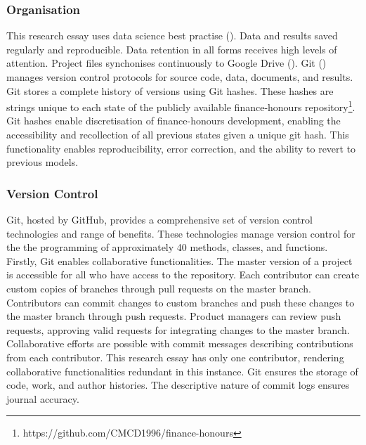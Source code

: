 \documentclass[12pt]{article}
\begin{document}
{\subsubsection{Organisation}
This research essay uses data science best practise (\cite{J:10}).
Data and results saved regularly and reproducible. 
Data retention in all forms receives high levels of attention. 
Project files synchonises continuously to Google Drive (\cite{Google_Drive}). 
Git (\cite{Git}) manages version control protocols for source code, data, documents, and results.
Git stores a complete history of versions using Git hashes. 
These hashes are strings unique to each state of the publicly available finance-honours repository\footnote[1]{https://github.com/CMCD1996/finance-honours}. 
Git hashes enable discretisation of finance-honours development, enabling the accessibility and recollection of all previous states given a unique git hash. 
This functionality enables reproducibility, error correction, and the ability to revert to previous models.

\subsubsection{Version Control}\label{Version Control}
Git, hosted by GitHub, provides a comprehensive set of version control technologies and range of benefits.
These technologies manage version control for the the programming of approximately 40 methods, classes, and functions.
Firstly, Git enables collaborative functionalities. 
The master version of a project is accessible for all who have access to the repository. 
Each contributor can create custom copies of branches through pull requests on the master branch. 
Contributors can commit changes to custom branches and push these changes to the master branch through push requests. 
Product managers can review push requests, approving valid requests for integrating changes to the master branch. 
Collaborative efforts are possible with commit messages describing contributions from each contributor. 
This research essay has only one contributor, rendering collaborative functionalities redundant in this instance.
Git ensures the storage of code, work, and author histories.
The descriptive nature of commit logs ensures journal accuracy.

}
\end{document}
